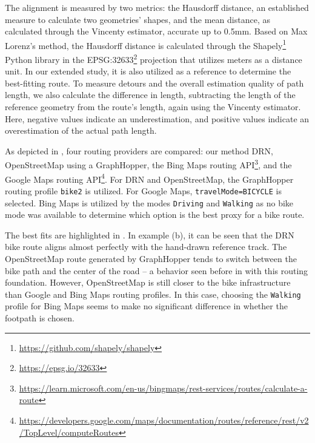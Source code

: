 The alignment is measured by two metrics: the Hausdorff distance, an established measure to calculate two geometries' shapes, and the mean distance, as calculated through the Vincenty estimator, accurate up to 0.5mm. Based on Max Lorenz's \cite{lorenz_2022} method, the Hausdorff distance is calculated through the Shapely\footnote{\url{https://github.com/shapely/shapely}} Python library in the EPSG:32633\footnote{\url{https://epsg.io/32633}} projection that utilizes meters as a distance unit. In our extended study, it is also utilized as a reference to determine the best-fitting route. To measure detours and the overall estimation quality of path length, we also calculate the difference in length, subtracting the length of the reference geometry from the route's length, again using the Vincenty estimator. Here, negative values indicate an underestimation, and positive values indicate an overestimation of the actual path length.

As depicted in , four routing providers are compared: our method DRN, OpenStreetMap using a GraphHopper, the Bing Maps routing API\footnote{\url{https://learn.microsoft.com/en-us/bingmaps/rest-services/routes/calculate-a-route}}, and the Google Maps routing API\footnote{\url{https://developers.google.com/maps/documentation/routes/reference/rest/v2/TopLevel/computeRoutes}}. For DRN and OpenStreetMap, the GraphHopper routing profile \texttt{bike2} is utilized. For Google Maps, \texttt{travelMode=\allowbreak BICYCLE} is selected. Bing Maps is utilized by the modes \texttt{Driving} and \texttt{Walking} as no bike mode was available to determine which option is the best proxy for a bike route.

The best fits are highlighted in . In example (b), it can be seen that the DRN bike route aligns almost perfectly with the hand-drawn reference track. The OpenStreetMap route generated by GraphHopper tends to switch between the bike path and the center of the road -- a behavior seen before in  with this routing foundation. However, OpenStreetMap is still closer to the bike infrastructure than Google and Bing Maps routing profiles. In this case, choosing the \texttt{Walking} profile for Bing Maps seems to make no significant difference in whether the footpath is chosen.

